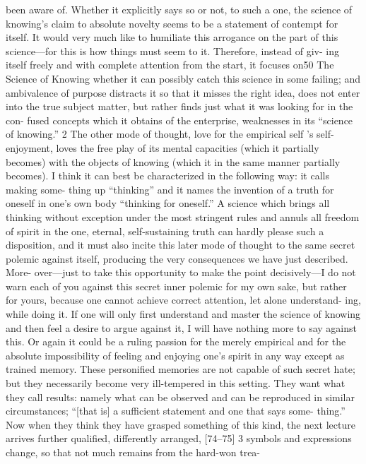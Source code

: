 been aware of. Whether it explicitly says so or not, to such a one, the science
of knowing’s claim to absolute novelty seems to be a statement of contempt
for itself. It would very much like to humiliate this arrogance on the part of
this science—for this is how things must seem to it. Therefore, instead of giv-
ing itself freely and with complete attention from the start, it focuses on50
The Science of Knowing
whether it can possibly catch this science in some failing; and ambivalence of
purpose distracts it so that it misses the right idea, does not enter into the
true subject matter, but rather finds just what it was looking for in the con-
fused concepts which it obtains of the enterprise, weaknesses in its “science
of knowing.” 2
The other mode of thought, love for the empirical self ’s self-enjoyment,
loves the free play of its mental capacities (which it partially becomes) with
the objects of knowing (which it in the same manner partially becomes). I
think it can best be characterized in the following way: it calls making some-
thing up “thinking” and it names the invention of a truth for oneself in one’s
own body “thinking for oneself.” A science which brings all thinking without
exception under the most stringent rules and annuls all freedom of spirit in
the one, eternal, self-sustaining truth can hardly please such a disposition, and
it must also incite this later mode of thought to the same secret polemic
against itself, producing the very consequences we have just described. More-
over—just to take this opportunity to make the point decisively—I do not
warn each of you against this secret inner polemic for my own sake, but rather
for yours, because one cannot achieve correct attention, let alone understand-
ing, while doing it. If one will only first understand and master the science of
knowing and then feel a desire to argue against it, I will have nothing more to
say against this.
Or again it could be a ruling passion for the merely empirical and for
the absolute impossibility of feeling and enjoying one’s spirit in any way except
as trained memory. These personified memories are not capable of such secret
hate; but they necessarily become very ill-tempered in this setting. They want
what they call results: namely what can be observed and can be reproduced in
similar circumstances; “[that is] a sufficient statement and one that says some-
thing.” Now when they think they have grasped something of this kind, the
next lecture arrives further qualified, differently arranged, [74–75] 3 symbols
and expressions change, so that not much remains from the hard-won trea-
